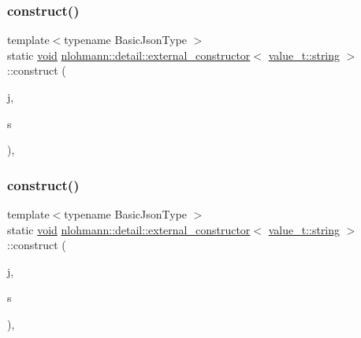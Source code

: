 \subsubsection{\texorpdfstring{construct()}{construct()}\hspace{0.1cm}{\footnotesize\ttfamily [1/3]}}
{\footnotesize\ttfamily template$<$typename Basic\+Json\+Type $>$ \\
static \hyperlink{namespacenlohmann_1_1detail_a59fca69799f6b9e366710cb9043aa77d}{void} \hyperlink{structnlohmann_1_1detail_1_1external__constructor}{nlohmann\+::detail\+::external\+\_\+constructor}$<$ \hyperlink{namespacenlohmann_1_1detail_a1ed8fc6239da25abcaf681d30ace4985ab45cffe084dd3d20d928bee85e7b0f21}{value\+\_\+t\+::string} $>$\+::construct (\begin{DoxyParamCaption}\item[{Basic\+Json\+Type \&}]{j,  }\item[{const typename Basic\+Json\+Type\+::string\+\_\+t \&}]{s }\end{DoxyParamCaption})\hspace{0.3cm}{\ttfamily [inline]}, {\ttfamily [static]}}

\mbox{\label{structnlohmann_1_1detail_1_1external__constructor_3_01value__t_1_1string_01_4_a74f56b9ca1d4e8db9751353d76668322}} 
\subsubsection{\texorpdfstring{construct()}{construct()}\hspace{0.1cm}{\footnotesize\ttfamily [2/3]}}
{\footnotesize\ttfamily template$<$typename Basic\+Json\+Type $>$ \\
static \hyperlink{namespacenlohmann_1_1detail_a59fca69799f6b9e366710cb9043aa77d}{void} \hyperlink{structnlohmann_1_1detail_1_1external__constructor}{nlohmann\+::detail\+::external\+\_\+constructor}$<$ \hyperlink{namespacenlohmann_1_1detail_a1ed8fc6239da25abcaf681d30ace4985ab45cffe084dd3d20d928bee85e7b0f21}{value\+\_\+t\+::string} $>$\+::construct (\begin{DoxyParamCaption}\item[{Basic\+Json\+Type \&}]{j,  }\item[{typename Basic\+Json\+Type\+::string\+\_\+t \&\&}]{s }\end{DoxyParamCaption})\hspace{0.3cm}{\ttfamily [inline]}, {\ttfamily [static]}}

